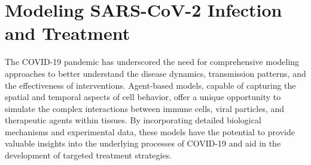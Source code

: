 
 


\section{Modeling SARS-CoV-2 Infection and Treatment}\label{sec:intro:covid}
The COVID-19 pandemic has underscored the need for comprehensive modeling approaches to better understand the disease dynamics, transmission patterns, and the effectiveness of interventions. Agent-based models, capable of capturing the spatial and temporal aspects of cell behavior, offer a unique opportunity to simulate the complex interactions between immune cells, viral particles, and therapeutic agents within tissues. By incorporating detailed biological mechanisms and experimental data, these models have the potential to provide valuable insights into the underlying processes of COVID-19 and aid in the development of targeted treatment strategies.


